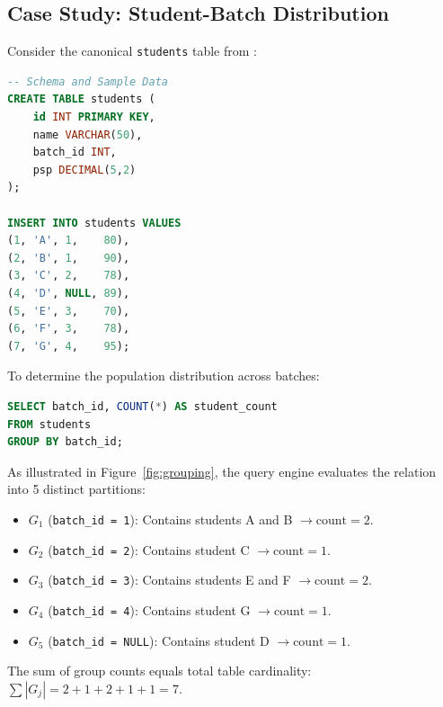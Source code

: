 \documentclass[10pt,twocolumn,letterpaper]{article}
\begin{document}
\subsection{Case Study: Student-Batch Distribution}
Consider the canonical \texttt{students} table from \cite{sql5lecture}:
\begin{lstlisting}[language=SQL]
-- Schema and Sample Data
CREATE TABLE students (
    id INT PRIMARY KEY,
    name VARCHAR(50),
    batch_id INT,
    psp DECIMAL(5,2)
);

INSERT INTO students VALUES
(1, 'A', 1,    80),
(2, 'B', 1,    90),
(3, 'C', 2,    78),
(4, 'D', NULL, 89),
(5, 'E', 3,    70),
(6, 'F', 3,    78),
(7, 'G', 4,    95);
\end{lstlisting}

To determine the population distribution across batches:
\begin{lstlisting}[language=SQL]
SELECT batch_id, COUNT(*) AS student_count
FROM students
GROUP BY batch_id;
\end{lstlisting}

As illustrated in Figure~\ref{fig:grouping}, the query engine evaluates the relation into 5 distinct partitions:
\begin{itemize}
    \item $G_1$ (\texttt{batch\_id = 1}): Contains students A and B $\to \text{count} = 2$.
    \item $G_2$ (\texttt{batch\_id = 2}): Contains student C $\to \text{count} = 1$.
    \item $G_3$ (\texttt{batch\_id = 3}): Contains students E and F $\to \text{count} = 2$.
    \item $G_4$ (\texttt{batch\_id = 4}): Contains student G $\to \text{count} = 1$.
    \item $G_5$ (\texttt{batch\_id = NULL}): Contains student D $\to \text{count} = 1$.
\end{itemize}
The sum of group counts equals total table cardinality: $\sum |G_j| = 2 + 1 + 2 + 1 + 1 = 7$.
\end{document}
